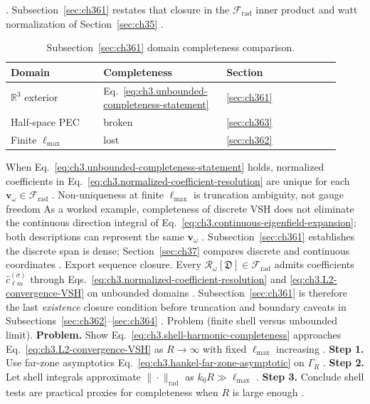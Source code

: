 . Subsection~\ref{sec:ch361} restates that closure in the \(\mathcal{F}_{\mathrm{rad}}\) inner
product and watt normalization of Section~\ref{sec:ch35} .
\begin{table}[t]
\centering
\caption{Subsection~\ref{sec:ch361} domain completeness comparison.}
\label{tab:ch3.361-domain-comparison}
\small
\begin{tabular}{@{}p{0.26\linewidth}p{0.34\linewidth}p{0.32\linewidth}@{}}
\toprule
Domain & Completeness & Section \\
\midrule
\(\mathbb{R}^{3}\) exterior & Eq.~\eqref{eq:ch3.unbounded-completeness-statement} & \ref{sec:ch361} \\
Half-space PEC & broken & \ref{sec:ch363} \\
Finite \(\ell_{\max}\) & lost & \ref{sec:ch362} \\
\bottomrule
\end{tabular}
\end{table}
When Eq.~\eqref{eq:ch3.unbounded-completeness-statement} holds, normalized coefficients in
Eq.~\eqref{eq:ch3.normalized-coefficient-resolution} are unique for each \(\mathbf{v}_\omega\in\mathcal{F}_{\mathrm{rad}}\)
. Non-uniqueness at finite \(\ell_{\max}\) is truncation ambiguity, not gauge freedom
As a worked example, completeness of discrete VSH does not eliminate the continuous direction integral of
Eq.~\eqref{eq:ch3.continuous-eigenfield-expansion}; both descriptions can represent the same \(\mathbf{v}_\omega\)
. Subsection~\ref{sec:ch361} establishes the discrete span is dense; Section~\ref{sec:ch37}
compares discrete and continuous coordinates .
Export sequence closure. Every \(\mathcal{R}_\omega[\mathfrak{D}]\in\mathcal{F}_{\mathrm{rad}}\) admits coefficients \(\widehat{c}_{\ell m}^{(\sigma)}\)
through Eqs.~\eqref{eq:ch3.normalized-coefficient-resolution} and \eqref{eq:ch3.L2-convergence-VSH} on unbounded domains
. Subsection~\ref{sec:ch361} is therefore the last \emph{existence} closure condition before
truncation and boundary caveats in Subsections~\ref{sec:ch362}--\ref{sec:ch364} .
Problem (finite shell versus unbounded limit). \textbf{Problem.} Show Eq.~\eqref{eq:ch3.shell-harmonic-completeness} approaches Eq.~\eqref{eq:ch3.L2-convergence-VSH} as
\(R\to\infty\) with fixed \(\ell_{\max}\) increasing .
\textbf{Step 1.} Use far-zone asymptotics Eq.~\eqref{eq:ch3.hankel-far-zone-asymptotic} on \(\Gamma_R\) .
\textbf{Step 2.} Let shell integrals approximate \(\|\cdot\|_{\mathrm{rad}}\) as \(k_{0}R\gg\ell_{\max}\) .
\textbf{Step 3.} Conclude shell tests are practical proxies for completeness when \(R\) is large enough .
